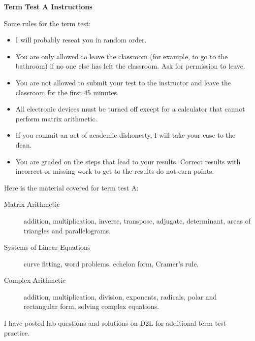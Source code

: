 \documentclass[11pt]{article}
\begin{document}
\textbf{Term Test A Instructions}

Some rules for the term test:
\begin{itemize}
\item I will probably reseat you in random order.
\item You are only allowed to leave the classroom (for example, to go
  to the bathroom) if no one else has left the classroom. Ask for
  permission to leave. 
\item You are not allowed to submit your test to the instructor and
  leave the classroom for the first 45 minutes.
\item All electronic devices must be turned off except for a
  calculator that cannot perform matrix arithmetic.
\item If you commit an act of academic dishonesty, I will take your
  case to the dean.
\item You are graded on the steps that lead to your results. Correct
  results with incorrect or missing work to get to the results do not
  earn points.
\end{itemize}

Here is the material covered for term test A:
\begin{description}
\item[Matrix Arithmetic] addition, multiplication, inverse, transpose,
  adjugate, determinant, areas of triangles and parallelograms.
\item[Systems of Linear Equations] curve fitting, word problems,
  echelon form, Cramer's rule.
\item[Complex Arithmetic] addition, multiplication, division,
  exponents, radicals, polar and rectangular form, solving complex
  equations.
\end{description}

I have posted lab questions and solutions on D2L for additional term
test practice.
\end{document}
